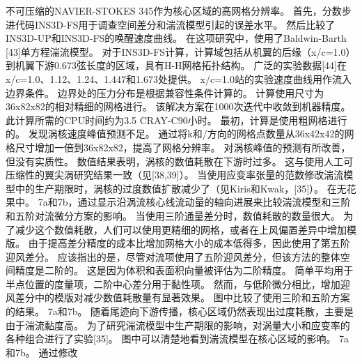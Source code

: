 \documentclass[UTF8,11pt,a4paper,openany,fontset=fandol]{ctexbook}
\begin{document}
不可压缩的NAVIER-STOKES 345作为核心区域的高网格分辨率。 首先，分数步进代码INS3D-FS用于调查空间差分和湍流模型引起的误差水平。 然后比较了INS3D-UP和INS3D-FS的唤醒速度曲线。 在这项研究中，使用了Baldwin-Barth [43]单方程湍流模型。 对于INS3D-FS计算，计算域包括从机翼的后缘（x/c=1.0）到机翼下游0.673弦长度的区域，具有H-H网格拓扑结构。 广泛的实验数据[44]在x/c=1.0、1.12、1.24、1.447和1.673处提供。 x/c=1.0站的实验速度曲线用作流入边界条件。 边界处的压力分布是根据兼容性条件计算的。 计算使用尺寸为36x82x82的相对精细的网格进行。 该解决方案在1000次迭代中收敛到机器精度。 此计算所需的CPU时间约为3.5 CRAY-C90小时。 最初，计算是使用粗网格进行的。 发现涡核速度峰值预测不足。 通过将k和/方向的网格点数量从36x42x42的网格尺寸增加一倍到36x82x82，提高了网格分辨率。 对涡核峰值的预测有所改善，但没有实质性。 数值结果表明，涡核的数值耗散在下游时过多。 这与使用人工可压缩性的翼尖涡研究结果一致（见[38,39]）。 当使用应变率张量的范数修改湍流模型中的生产期限时，涡核的过度数值扩散减少了（见Kiris和Kwak，[35]）。 在无花果中。 7a和7b，通过显示沿涡流核心线流动量的轴向进展来比较湍流模型和三阶和五阶对流微分方案的影响。 当使用三阶通量差分时，数值耗散的数量很大。 为了减少这个数值耗散，人们可以使用更精细的网格，或者在上风偏置差异中增加模版。 由于提高差分精度的成本比增加网格大小的成本低得多，因此使用了第五阶迎风差分。 应该指出的是，尽管对流项使用了五阶迎风差分，但该方法的整体空间精度是二阶的。 这是因为体积和表面积向量被评估为二阶精度。 简单平均用于半点位置的度量项，二阶中心差分用于黏性项。 然而，与低阶微分相比，增加迎风差分中的模版对减少数值耗散量有显著效果。 图中比较了使用三阶和五阶方案的结果。 7a和7b。 随着尾迹向下游传播，核心区域仍然表现出过度耗散，主要是由于湍流黏度高。 为了研究湍流模型中生产期限的影响，对涡量大小和应变率的各种组合进行了实验[35]。 图中可以清楚地看到湍流模型在核心区域的影响。 7a和7b。 通过修改
\end{document}

